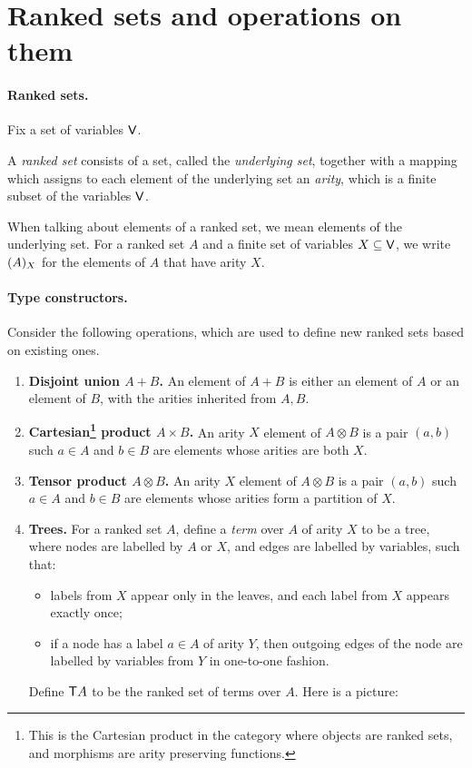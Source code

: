 
\section{Ranked sets and operations on them}
\paragraph*{Ranked sets.}
Fix a set of variables $\mathsf V$.
\begin{definition}
    A \emph{ranked set} consists of a set, called the \emph{underlying set}, together with a mapping  which assigns to each element of the underlying set an \emph{arity}, which is a finite subset of the variables $\mathsf V$. 
\end{definition}
When talking about elements of a ranked set, we mean elements of the underlying set.   For a ranked set $A$ and a finite set of variables $X \subseteq \mathsf V$, we write $(A)_{X}$ for the elements of $A$ that have arity $X$. 

\paragraph*{Type constructors.}
Consider the following operations, which are used to define new ranked sets based on existing ones.
\begin{enumerate}
    \item {\bf Disjoint union $A+B$.} An element of $A+B$ is either an element of $A$ or an element of $B$, with the arities inherited from $A,B$. 
    \item {\bf Cartesian\footnote{This is the Cartesian product in the category where objects are ranked sets, and morphisms are arity preserving functions.}  product $A \times B$.} An arity $X$ element of $A \otimes B$ is a pair $(a,b)$ such $a \in A$ and $b \in B$ are elements whose arities are both $X$.
    \item {\bf Tensor product $A \otimes B$.} An arity $X$ element of $A \otimes B$ is a pair $(a,b)$ such $a \in A$ and $b \in B$ are elements whose arities form a partition of $X$. 
    \item {\bf Trees.} For a ranked set  $A$, define a \emph{term} over $A$ of arity $X$ to be a tree, where nodes are labelled by  $A$ or $X$, and edges are labelled by  variables, such that:
    \begin{itemize}
        \item labels from $X$ appear only in the leaves, and each label from $X$ appears exactly once;
        \item if a node has a label $a \in A$ of arity $Y$, then outgoing edges of the node are labelled by variables from $Y$ in one-to-one fashion. 
    \end{itemize}
    Define $\mathsf T A$ to be the ranked set of terms over $A$. Here is a picture: 
\end{enumerate}    

